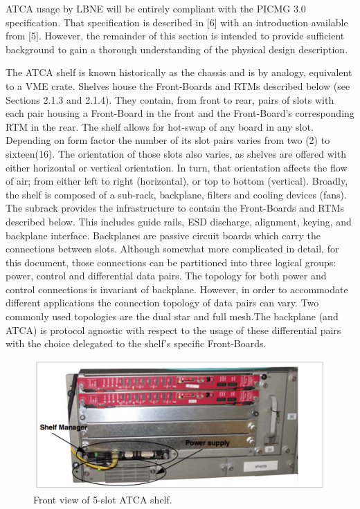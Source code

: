 ATCA usage by LBNE will be entirely compliant with the PICMG 3.0 specification. That specification is described in [6] with an introduction available from [5]. However, the remainder of this section is intended to provide sufficient background to gain a thorough understanding of the physical design description.

The ATCA shelf is known historically as the chassis and is by analogy, equivalent to a VME crate. Shelves house the Front-Boards and RTMs described below (see Sections 2.1.3 and 2.1.4). They contain, from front to rear, pairs of slots with each pair housing a Front-Board in the front and the Front-Board's corresponding RTM in the rear. The shelf allows for hot-swap of any board in any slot. Depending on form factor the number of its slot pairs varies from two (2) to sixteen(16). The orientation of those slots also varies, as shelves are offered with either horizontal or vertical orientation. In turn, that orientation affects the flow of air; from either left to right (horizontal), or top to bottom (vertical).
Broadly, the shelf is composed of a sub-rack, backplane, filters and cooling devices (fans). The subrack provides the infrastructure to contain the Front-Boards and RTMs described below. This includes guide rails, ESD discharge, alignment, keying, and backplane interface. Backplanes are passive circuit boards which carry the connections between slots. Although somewhat more complicated in detail, for this document, those connections can be partitioned into three logical groups: power, control and differential data pairs. The topology for both power and control connections is invariant of backplane. However, in order to accommodate different applications the connection topology of data pairs can vary. Two commonly used topologies are the dual star and full mesh.The backplane (and ATCA) is protocol agnostic with respect to the usage of these differential pairs with the choice delegated to the shelf's specific Front-Boards.

\begin{figure}[tbh]
\includegraphics[scale=0.8]{shelf-front.pdf}
\caption{Front view of 5-slot ATCA shelf.}
\label{fig:frontShelf}
\end{figure} 


